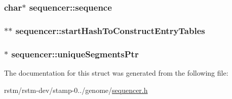 \hypertarget{structsequencer_a242c4081f37000b0284d4f82ae9b866f}{
\subsubsection[{sequence}]{\setlength{\rightskip}{0pt plus 5cm}char$\ast$ sequencer\-::sequence}}\label{structsequencer_a242c4081f37000b0284d4f82ae9b866f}
\hypertarget{structsequencer_afdfe81e251fb4779168c7c587ac12e18}{
\subsubsection[{start\-Hash\-To\-Construct\-Entry\-Tables}]{$\ast$$\ast$ sequencer\-::start\-Hash\-To\-Construct\-Entry\-Tables}}\label{structsequencer_afdfe81e251fb4779168c7c587ac12e18}
\hypertarget{structsequencer_abbe1f69d46c1485a043a44e88ca06b91}{
\subsubsection[{unique\-Segments\-Ptr}]{$\ast$ sequencer\-::unique\-Segments\-Ptr}}\label{structsequencer_abbe1f69d46c1485a043a44e88ca06b91}


The documentation for this struct was generated from the following file\-:\begin{DoxyCompactItemize}
\item 
rstm/rstm-\/dev/stamp-\/0../genome/\hyperlink{sequencer_8h}{sequencer.\-h}\end{DoxyCompactItemize}
